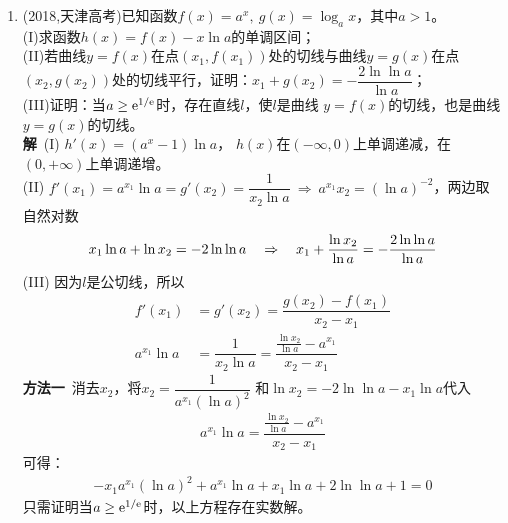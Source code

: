 \begin{enumerate}[label={【\textbf{例\thechapter.\arabic*}】},
 leftmargin=\inteval{\myenumleftmargin}pt,
 itemsep=\inteval{\myenumitempsep}pt,
 itemindent=\inteval{\myenumitemindent}pt]
\begin{gather*}
{        \right|}{f'(x_1)}>\frac{\left|f\Big(\dfrac{p}{q}\Big)\right|}{f'(2)}
    =\frac{\left|2p^4+3p^3q-3p^2q^2-6pq^3+aq^4\right|}{f'(2)q^4}
\end{gather*}
因为$ \dfrac{p}{q}-x_0\neq 0 $，所以$ |2p^4+3p^3q-3p^2q^2-
6pq^3+aq^4|>0 $，又因为$ p,q $为正整数，所以
$ |2p^4+3p^3q-3p^2q^2-6pq^3+aq^4| $也是正整数，
那么它必然大于等于1，
\begin{gather*}
    \left|\frac{p}{q}-x_0\right|>\frac{1}{f'(2)q^4}
\end{gather*}
只需令$ A=|f'(2)| $，就有$ \left|\dfrac{p}{q}-x_0\right|>\dfrac{1}{Aq^4} $.\\
\textbf{注}\ 第(2)问实际上是拉格朗日中值定理，设$ m\in[1,x_0) $，做逆向分析，
有$ h(m)=\varphi_1(m)>0 $，$ h(x_0)=\varphi_2(m)<0 $，$ f'(x_0)(m-x_0)<f(m)
<f'(m)(m-x_0) $，即
\begin{gather}
    f'(x_0)<\frac{f(m)-f(x_0)}{m-x_0}=f'(\xi)<f'(m)
\end{gather}
因为$ f'(x) $在$ (\dfrac{1}{4},+\infty) $上单调递增，所以上式显然成立。

第(3)问实际上是刘维尔逼近定理。

\item (2018,天津高考)已知函数$ f(x)=a^x,\ g(x)=\log_{a} x $，其中$ a>1 $。\\
(I)求函数$ h(x)=f(x)-x\ln a $的单调区间；\\
(II)若曲线$ y=f(x) $在点$ (x_1,f(x_1)) $处的切线与曲线$ y=g(x) $在点
$ (x_2,g(x_2)) $处的切线平行，证明：$ x_1+g(x_2)=
-\dfrac{2\ln\ln a}{\ln a} $；\\
(III)证明：当$ a\geq \mathrm{e}^{1/\mathrm{e}} $时，存在直线$ l $，使$ l $是曲线
$ y=f(x) $的切线，也是曲线$ y=g(x) $的切线。\\
\textbf{解}\ (I) $ h'(x)=(a^x-1)\ln a $，
$ h(x) $在$ (-\infty,0) $上单调递减，在$ (0,+\infty) $上单调递增。\\
(II) $ f'(x_1)=a^{x_1}\ln a=g'(x_2)=\dfrac{1}{x_2\ln a}\
\Rightarrow \  a^{x_1}x_2=(\ln a)^{-2} $，两边取自然对数
\begin{gather*}
    x_1\ln a+\ln x_2=-2\ln\ln a\quad \Rightarrow \quad 
    x_1+\frac{\ln x_2}{\ln a}=-\dfrac{2\ln\ln a}{\ln a}
\end{gather*}
(III) 因为$ l $是公切线，所以
\begin{align*}
    f'(x_1) &=g'(x_2)=\dfrac{g(x_2)-f(x_1)}{x_2-x_1} \\
    a^{x_1}\ln a &=\dfrac{1}{x_2\ln a}=\dfrac{\frac{\ln x_2}{\ln a}
        -a^{x_1}}{x_2-x_1}
\end{align*}
\textbf{方法一}\ 消去$ x_2 $，将$ x_2=\dfrac{1}{a^{x_1}(\ln a)^2} $
和$ \ln x_2=-2\ln\ln a-x_1\ln a $代入
\begin{gather*}
    a^{x_1}\ln a =\dfrac{\frac{\ln x_2}{\ln a}-a^{x_1}}{x_2-x_1}
\end{gather*}
可得：
\begin{gather*}
    -x_1a^{x_1}(\ln a)^2+a^{x_1}\ln a +x_1\ln a+2\ln\ln a+1=0
\end{gather*}
只需证明当$ a\geq \mathrm{e}^{1/\mathrm{e}} $时，以上方程存在实数解。


\end{enumerate}
